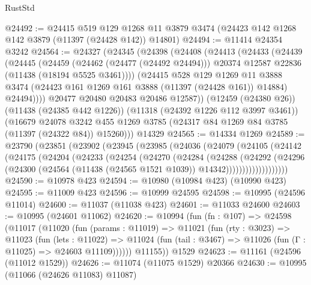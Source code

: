 \begin{lexlean}{RustStd}
\begin{coremodule}
@24492 := @24415
    @519
    @129
    @1268
    @11
    @3879
    @3474
    (@24423 @142 @1268 @142 @3879 (@11397 (@24428 @142)) @14801)
@24494 := @11414 @24354 @3242
@24564 := @24327
    (@24345
      (@24398
        (@24408
          (@24413
            (@24433
              (@24439
                (@24445
                  (@24459
                    (@24462 (@24477 (@24492 @24494)))
                    @20374
                    @12587
                    @22836
                    (@11438 (@18194 @5525 @3461))))
                (@24415
                  @528
                  @129
                  @1269
                  @11
                  @3888
                  @3474
                  (@24423 @161 @1269 @161 @3888 (@11397 (@24428 @161)) @14884)
                  @24494))))
          @20477
          @20480
          @20483
          @20486
          @12587))
      (@12459 (@24380 @26))
      (@11438 (@24385 @442 @1226))
      (@11318 (@24392 @1226 @112 @3997 @3461))
      (@16679
        @24078
        @3242
        @455
        @1269
        @3785
        (@24317 @84 @1269 @84 @3785 (@11397 (@24322 @84)) @15260)))
    @14329
@24565 := @14334 @1269
@24589 := @23790
    (@23851
      (@23902
        (@23945
          (@23985
            (@24036
              (@24079
                (@24105
                  (@24142
                    (@24175
                      (@24204
                        (@24233
                          (@24254
                            (@24270
                              (@24284
                                (@24288
                                  (@24292
                                    (@24296
                                      (@24300
                                        (@24564
                                          (@11438 (@24565 @1521 @1039))
                                          @14342)))))))))))))))))))
@24590 := @10978 @423
@24594 := @10980 (@10984 @423) (@10990 @423)
@24595 := @11009 @423
@24596 := @10999 @24595
@24598 := @10995 (@24596 @11014)
@24600 := @11037 (@11038 @423)
@24601 := @11033 @24600
@24603 := @10995 (@24601 @11062)
@24620 := @10994
    (fun (fn : @107) =>
    @24598
      (@11017
        (@11020
          (fun (params : @11019) =>
          @11021
            (fun (rty : @3023) =>
            @11023
              (fun (lets : @11022) =>
              @11024 (fun (tail : @3467) => @11026 (fun (Γ : @11025) => @24603 @11109))))))
        @11155))
    @1529
@24623 := @11161 (@24596 (@11012 @1529))
@24626 := @11074 (@11075 @1529) @20366
@24630 := @10995 (@11066 (@24626 @11083) @11087)

\end{coremodule}
\end{lexlean}
